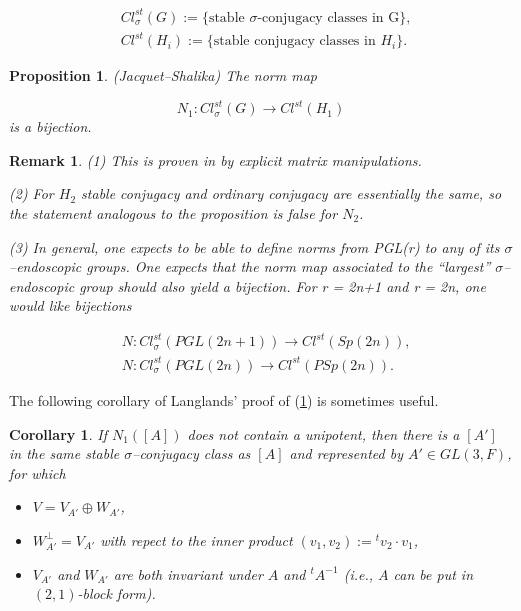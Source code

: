 \documentclass[12pt,letterpaper]{article}
\newtheorem{corollary}[theorem]{Corollary}
\newtheorem{proposition}[theorem]{Proposition}
\newtheorem{remark}{Remark}
\begin{document}
\[
\begin{split}
&Cl^{st}_{\sigma}(G) :=\{\text{stable $\sigma$-conjugacy classes in G}\},\\
&Cl^{st}(H_i) := \{\text{stable conjugacy classes in $H_i$}\}.
\end{split}
\]

\begin{proposition} (Jacquet--Shalika)
\label{prop:1.13} 
The norm map

\[
N_1 : Cl^{st}_{\sigma}(G) \rightarrow Cl^{st}(H_1)
\]
is a bijection.
\end{proposition}

\begin{remark} 

(1) This is proven in \cite{La1} by explicit
matrix manipulations.
\newline

(2) For $H_2$ stable conjugacy and ordinary conjugacy
are essentially the same, so the statement analogous to the 
proposition is false for $N_2$. 
\newline

(3) In general, one expects to be able to define norms from PGL(r) to
any of its $\sigma$--endoscopic groups. One expects that the norm map
associated to the ``largest'' $\sigma$--endoscopic group should also yield a
bijection. For r = 2n+1 and r = 2n, one would like bijections

\[
\begin{split}
&N: Cl^{st}_{\sigma}(PGL(2n+1)) \rightarrow Cl^{st}(Sp(2n)),\\
&N: Cl^{st}_{\sigma}(PGL(2n)) \rightarrow Cl^{st}(PSp(2n)).
\end{split}
\]
\end{remark}
 
The following corollary of Langlands' proof of (\ref{prop:1.13}) 
is sometimes useful.

\begin{corollary}
\label{cor:1.14} 
If $N_1([A])$ does not contain a unipotent, then 
there is a $[A']$ in the same stable $\sigma$--conjugacy class 
as $[A]$ and 
represented by $A' \in GL(3,F)$, for which

\begin{itemize}

\item[(a)] 
$V = V_{A'} \oplus W_{A'}$,

\item[(b)] 
$W_{A'}^{\bot} = V_{A'}$ with repect to the inner product
$(v_1,v_2):={^{t}v_2}\cdot v_1$,

\item[(c)] 
$V_{A'}$ and $W_{A'}$ are both invariant under $A$ and 
${^{t}A^{-1}}$ (i.e., $A$ can be put in $(2,1)$-block form).
\end{itemize}
\end{corollary}
\end{document}
